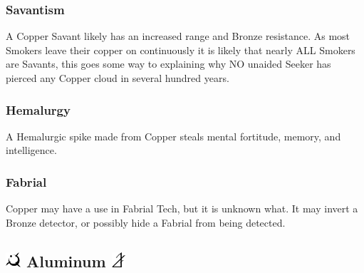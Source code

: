\documentclass[conference]{IEEEtran}
\newcommand{\n}{\hfill\break}
\begin{document}
 \subsubsection*{\textbf{Savantism}}
A Copper Savant likely has an increased range and Bronze resistance.\cite{savant-pierce}  As most Smokers leave their copper on continuously it is likely that nearly ALL Smokers are Savants,\cite{WoF} this goes some way to explaining why NO unaided Seeker has pierced any Copper cloud in several hundred years.\cite{TFE-CH31}\\
\subsubsection*{\textbf{Hemalurgy}}
A Hemalurgic spike made from Copper steals mental fortitude, memory, and intelligence.\cite{HE-TB}\\
\subsubsection*{\textbf{Fabrial}}
Copper may have a use in Fabrial Tech, but it is unknown what.  It may invert a Bronze detector, or possibly hide a Fabrial from being detected.
\n
\subsection*{\includegraphics[height=1em]{images/Aluminum.png}  \textbf{Aluminum} \includegraphics[height=1em]{images/Aluminum_(Feruchemy).png}}
\end{document}
